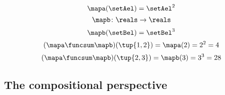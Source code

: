 \begin{forslides}
\begin{equation}
        \mapa(\setAel)=\setAel^2
    \end{equation}
    \begin{equation}\label{eq:slides_session2_179}
        \mapb\colon \reals \to \reals
    \end{equation}
    \begin{equation}\label{eq:slides_session2_180}
        \mapb(\setBel)=\setBel^3
    \end{equation}
    \begin{equation}\label{eq:slides_session2_181}
        (\mapa \funcsum \mapb)(\tup{1,2})=\mapa(2)=2^2=4
    \end{equation}
    \begin{equation}\label{eq:slides_session2_182}
        (\mapa \funcsum \mapb)(\tup{2,3})=\mapb(3)=3^3 = 28
    \end{equation}

    \subsection{The compositional perspective}


\end{forslides}
